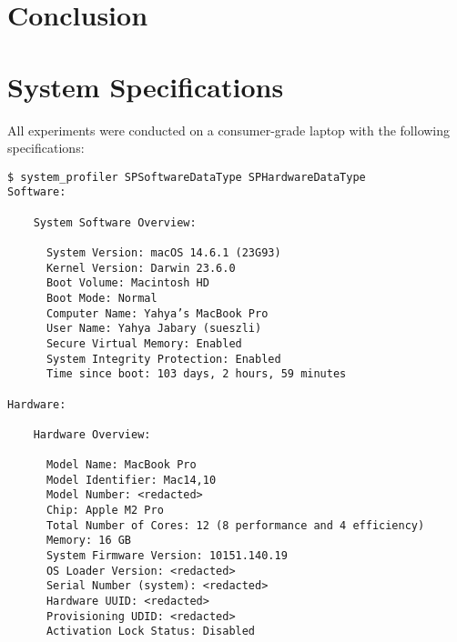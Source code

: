 \documentclass[manuscript]{acmart}
\begin{document}

\section{Conclusion}









\appendix

\section{System Specifications}

All experiments were conducted on a consumer-grade laptop with the following specifications:

\begin{footnotesize}
\begin{verbatim}
$ system_profiler SPSoftwareDataType SPHardwareDataType
Software:

    System Software Overview:

      System Version: macOS 14.6.1 (23G93)
      Kernel Version: Darwin 23.6.0
      Boot Volume: Macintosh HD
      Boot Mode: Normal
      Computer Name: Yahya’s MacBook Pro
      User Name: Yahya Jabary (sueszli)
      Secure Virtual Memory: Enabled
      System Integrity Protection: Enabled
      Time since boot: 103 days, 2 hours, 59 minutes

Hardware:

    Hardware Overview:

      Model Name: MacBook Pro
      Model Identifier: Mac14,10
      Model Number: <redacted>
      Chip: Apple M2 Pro
      Total Number of Cores: 12 (8 performance and 4 efficiency)
      Memory: 16 GB
      System Firmware Version: 10151.140.19
      OS Loader Version: <redacted>
      Serial Number (system): <redacted>
      Hardware UUID: <redacted>
      Provisioning UDID: <redacted>
      Activation Lock Status: Disabled
\end{verbatim}
\end{footnotesize}
\end{document}
